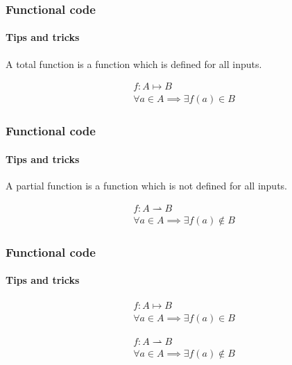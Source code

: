 \begin{frame}
    \frametitle{Functional code}
    \framesubtitle{Tips and tricks}

    A total function is a function which is defined for all inputs.

    \pause

    \begin{definition}
        \begin{align*}
        & f: A \mapsto B\\
        & \forall a \in A \implies \exists f(a) \in B
        \end{align*}
    \end{definition}
\end{frame}

\begin{frame}
    \frametitle{Functional code}
    \framesubtitle{Tips and tricks}

    A partial function is a function which is not defined for all inputs.

    \pause

    \begin{definition}
        \begin{align*}
        & f: A \rightharpoonup B\\
        & \forall a \in A \implies \exists f(a) \not\in B
        \end{align*}
    \end{definition}
\end{frame}

\begin{frame}
    \frametitle{Functional code}
    \framesubtitle{Tips and tricks}

    \begin{definition}
        \begin{align*}
        & f: A \mapsto B\\
        & \forall a \in A \implies \exists f(a) \in B
        \end{align*}
    \end{definition}

    \begin{definition}
        \begin{align*}
        & f: A \rightharpoonup B\\
        & \forall a \in A \implies \exists f(a) \not\in B
        \end{align*}
    \end{definition}
\end{frame}

